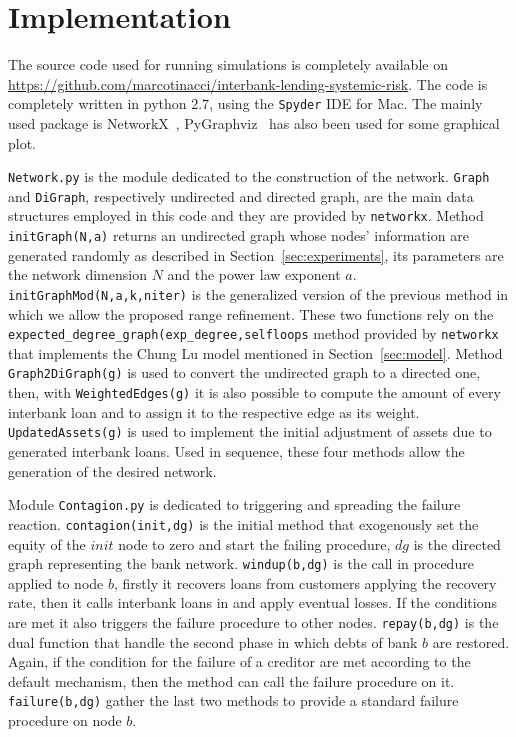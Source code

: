 \documentclass[a4paper, 11pt]{article}
\begin{document}

\section{Implementation} %
\label{sec:implementation}

The source code used for running simulations is completely available on \url{https://github.com/marcotinacci/interbank-lending-systemic-risk}. The code is completely written in python $2.7$, using the \texttt{Spyder} IDE for Mac. The mainly used package is NetworkX~\cite{networkx}, PyGraphviz~\cite{pygraphviz} has also been used for some graphical plot.

\texttt{Network.py} is the module dedicated to the construction of the network. \texttt{Graph} and \texttt{DiGraph}, respectively undirected and directed graph, are the main data structures employed in this code and they are provided by \texttt{networkx}. Method \texttt{initGraph(N,a)} returns an undirected graph whose nodes' information are generated randomly as described in Section~\ref{sec:experiments}, its parameters are the network dimension $N$ and the power law exponent $a$. \texttt{initGraphMod(N,a,k,niter)} is the generalized version of the previous method in which we allow the proposed range refinement. These two functions rely on the \texttt{expected\_degree\_graph(exp\_degree,selfloops} method provided by \texttt{networkx} that implements the Chung Lu model mentioned in Section~\ref{sec:model}. Method \texttt{Graph2DiGraph(g)} is used to convert the undirected graph to a directed one, then, with \texttt{WeightedEdges(g)} it is also possible to compute the amount of every interbank loan and to assign it to the respective edge as its weight. \texttt{UpdatedAssets(g)} is used to implement the initial adjustment of assets due to generated interbank loans. Used in sequence, these four methods allow the generation of the desired network.

Module \texttt{Contagion.py} is dedicated to triggering and spreading the failure reaction. \texttt{contagion(init,dg)} is the initial method that exogenously set the equity of the $init$ node to zero and start the failing procedure, $dg$ is the directed graph representing the bank network. \texttt{windup(b,dg)} is the call in procedure applied to node $b$, firstly it recovers loans from customers applying the recovery rate, then it calls interbank loans in and apply eventual losses. If the conditions are met it also triggers the failure procedure to other nodes. \texttt{repay(b,dg)} is the dual function that handle the second phase in which debts of bank $b$ are restored. Again, if the condition for the failure of a creditor are met according to the default mechanism, then the method can call the failure procedure on it. \texttt{failure(b,dg)} gather the last two methods to provide a standard failure procedure on node $b$.
\end{document}
